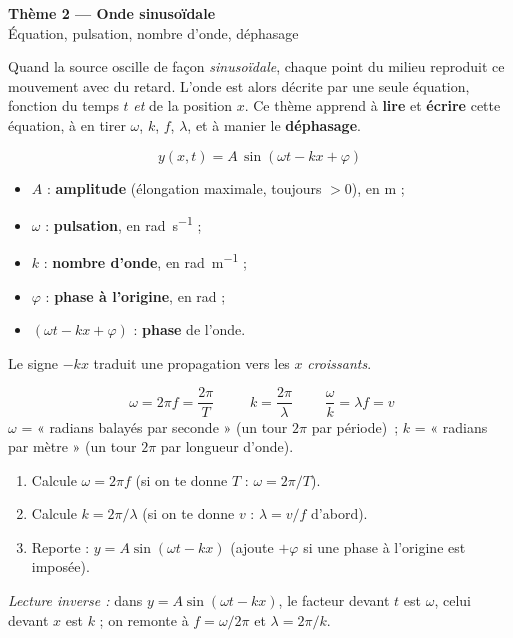 \documentclass[11pt,a4paper]{article}
\begin{document}

\begin{center}
{\LARGE\bfseries\color{primarydark} Thème 2 — Onde sinusoïdale}\\[2pt]
{\large\color{primary} Équation, pulsation, nombre d'onde, déphasage}
\end{center}

\medskip
Quand la source oscille de façon \emph{sinusoïdale}, chaque point du milieu reproduit ce
mouvement avec du retard. L'onde est alors décrite par une seule équation, fonction du temps
$t$ \emph{et} de la position $x$. Ce thème apprend à \textbf{lire} et \textbf{écrire} cette
équation, à en tirer $\omega$, $k$, $f$, $\lambda$, et à manier le \textbf{déphasage}.

\begin{cle}
\[ \boxed{\;y(x,t)=A\,\sin\!\left(\omega t - k x + \varphi\right)\;} \]
\begin{itemize}[leftmargin=1.4em,topsep=2pt,itemsep=1.5pt]
  \item $A$ : \textbf{amplitude} (élongation maximale, toujours $>0$), en \si{\metre} ;
  \item $\omega$ : \textbf{pulsation}, en \si{\radian\per\second} ;
  \item $k$ : \textbf{nombre d'onde}, en \si{\radian\per\metre} ;
  \item $\varphi$ : \textbf{phase à l'origine}, en \si{\radian} ;
  \item $(\omega t - kx + \varphi)$ : \textbf{phase} de l'onde.
\end{itemize}
Le signe $-kx$ traduit une propagation vers les $x$ \emph{croissants}.
\end{cle}

\begin{cle}
\[ \boxed{\;\omega = 2\pi f = \frac{2\pi}{T}\;}\qquad
   \boxed{\;k=\frac{2\pi}{\lambda}\;}\qquad
   \frac{\omega}{k}=\lambda f = v \]
$\omega$ = « radians balayés par seconde » (un tour $2\pi$ par période)~;
$k$ = « radians par mètre » (un tour $2\pi$ par longueur d'onde).
\end{cle}

\begin{methode}
\begin{enumerate}[leftmargin=1.6em,topsep=2pt,itemsep=1.5pt,label=\arabic*.]
  \item Calcule $\omega = 2\pi f$ (si on te donne $T$ : $\omega=2\pi/T$).
  \item Calcule $k = 2\pi/\lambda$ (si on te donne $v$ : $\lambda=v/f$ d'abord).
  \item Reporte : $y = A\sin(\omega t - kx)$ (ajoute $+\varphi$ si une phase à l'origine est imposée).
\end{enumerate}
\emph{Lecture inverse :} dans $y=A\sin(\omega t - kx)$, le facteur devant $t$ est $\omega$,
celui devant $x$ est $k$ ; on remonte à $f=\omega/2\pi$ et $\lambda=2\pi/k$.
\end{methode}
\end{document}
